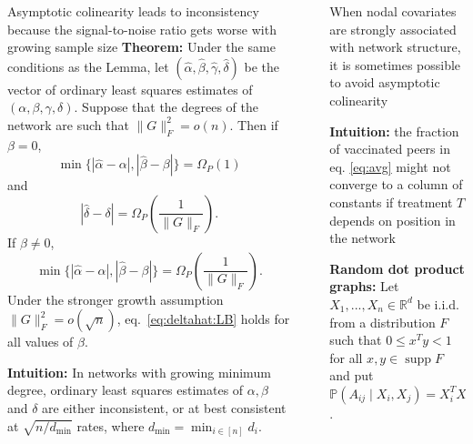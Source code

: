 \documentclass[final]{beamer}
\newcommand{\R}{\mathbb{R}}
\newcommand{\alphahat}{\hat{\alpha}}
\newcommand{\gammahat}{\hat{\gamma}}
\newcommand{\deltahat}{\hat{\delta}}
\newcommand{\betahat}{\hat{\beta}}
\newcommand \Omegap [1] {\Omega_P \left(#1\right)}
\DeclareMathOperator*{\supp}{supp}
\newlength{\sepwidth}
\newlength{\colwidth}
\newcommand{\separatorcolumn}{\begin{column}{\sepwidth}\end{column}}
\begin{document}
\begin{frame}[t]
\begin{columns}[t]
\begin{column}{\colwidth}
\begin{block}{Asymptotic colinearity leads to inconsistency because the signal-to-noise ratio gets worse with growing sample size}
                \textbf{Theorem:} Under the same conditions as the Lemma, let $(\alphahat, \betahat, \gammahat, \deltahat)$ be the vector of ordinary least squares estimates of $(\alpha, \beta, \gamma, \delta)$. Suppose that the degrees of the network are such that $\| G \|_F^2 = o(n)$.
                Then if $\beta = 0$,
                \begin{equation*}
                    \min\{ |\alphahat-\alpha|, |\betahat-\beta| \}
                    = \Omegap{ 1 }
                \end{equation*}
                and
                \begin{equation} \label{eq:deltahat:LB}
                    | \deltahat - \delta | = \Omegap{ \frac{1}{\|G\|_F} }.
                \end{equation}
                If $\beta \neq 0$,
                \begin{equation*}
                    \min\{ |\alphahat-\alpha|, |\betahat-\beta| \}
                    = \Omegap{ \frac{1}{\|G\|_F} }.
                \end{equation*}
                Under the stronger growth assumption $\|G\|_F^2 = o( \sqrt{n} )$, eq.~\eqref{eq:deltahat:LB} holds for all values of $\beta$.
                \vspace{3mm}

                \textbf{Intuition:} In networks with growing minimum degree, ordinary least squares estimates of $\alpha, \beta$ and $\delta$ are either inconsistent, or at best consistent at $\sqrt{n / d_\mathrm{min}}$ rates, where $d_\mathrm{min} = \min_{i \in [n]} d_i$.
            \end{block}
        \end{column}

        \separatorcolumn

        \begin{column}{\colwidth}
            \begin{block}{When nodal covariates are strongly associated with network structure, it is sometimes possible to avoid asymptotic colinearity}

                \textbf{Intuition:} the fraction of vaccinated peers in eq. \eqref{eq:avg} might not converge to a column of constants if treatment $T$ depends on position in the network

                \textbf{Random dot product graphs:} Let $X_1, ..., X_n \in \R^d$ be i.i.d. from a distribution $F$ such that $0 \le x^T y < 1$ for all $x,y \in \supp F$ and put $\mathbb{P}(A_{ij} \mid X_i, X_j) = X_i^T X_j$.


\end{block}
\end{column}
\end{columns}
\end{frame}
\end{document}
